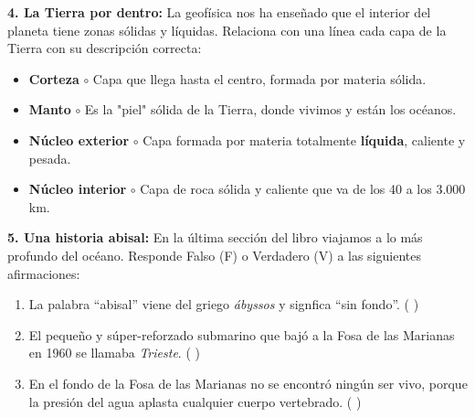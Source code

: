 \documentclass[12pt, letterpaper]{article}
\begin{document}
	\vspace{0.2cm}
	\begin{tcolorbox}[colframe=black, colback=white, height=3cm, width=\textwidth]
	\end{tcolorbox}
	\vspace{0.4cm}
	\newpage
	\noindent \textbf{4. La Tierra por dentro:} La geofísica nos ha enseñado que el interior del planeta tiene zonas sólidas y líquidas. Relaciona con una línea cada capa de la Tierra con su descripción correcta:
	
	\vspace{0.4cm}
	\begin{itemize}[itemsep=0.8cm, label={}]
		\item \textbf{Corteza} \hfill $\circ$ Capa que llega hasta el centro, formada por materia sólida.
		\item \textbf{Manto} \hfill $\circ$ Es la "piel" sólida de la Tierra, donde vivimos y están los océanos.
		\item \textbf{Núcleo exterior} \hfill $\circ$ Capa formada por materia totalmente \textbf{líquida}, caliente y pesada.
		\item \textbf{Núcleo interior} \hfill $\circ$ Capa de roca sólida y caliente que va de los 40 a los 3.000 km.
	\end{itemize}
	
	\vspace{0.5cm}
	
	\noindent \textbf{5. Una historia abisal:} En la última sección del libro viajamos a lo más profundo del océano. Responde Falso (F) o Verdadero (V) a las siguientes afirmaciones:
	
	\vspace{0.3cm}
	\begin{enumerate}[label=\alph*), itemsep=0.4cm]
		\item La palabra ``abisal'' viene del griego \textit{ábyssos} y signfica ``sin fondo''. \hfill ( \hspace{0.5cm} )
		\item El pequeño y súper-reforzado submarino que bajó a la Fosa de las Marianas en 1960 se llamaba \textit{Trieste}. \hfill ( \hspace{0.5cm} )
		\item En el fondo de la Fosa de las Marianas no se encontró ningún ser vivo, porque la presión del agua aplasta cualquier cuerpo vertebrado. \hfill ( \hspace{0.5cm} )
	\end{enumerate}
	
	
\end{document}
